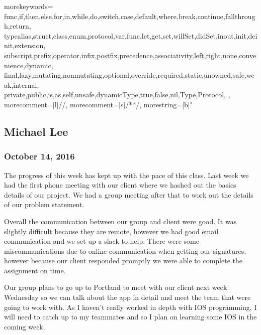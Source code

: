 {
  morekeywords={
    func,if,then,else,for,in,while,do,switch,case,default,where,break,continue,fallthrough,return,
    typealias,struct,class,enum,protocol,var,func,let,get,set,willSet,didSet,inout,init,deinit,extension,
    subscript,prefix,operator,infix,postfix,precedence,associativity,left,right,none,convenience,dynamic,
    final,lazy,mutating,nonmutating,optional,override,required,static,unowned,safe,weak,internal,
    private,public,is,as,self,unsafe,dynamicType,true,false,nil,Type,Protocol,
  },
  morecomment=[l]{//}, %
  morecomment=[s]{/*}{*/}, %
  morestring=[b]" %
}



\subsection{Michael Lee}

\subsubsection{October 14, 2016}\label{section}
The progress of this week has kept up with the pace of this class. Last
week we had the first phone meeting with our client where we hashed out
the basics details of our project. We had a group meeting after that to
work out the details of our problem statement.

Overall the communication between our group and client were good. It was
slightly difficult because they are remote, however we had good email
communication and we set up a slack to help. There were some
miscommunications due to online communication when getting our
signatures, however because our client responded promptly we were able
to complete the assignment on time.

Our group plans to go up to Portland to meet with our client next week
Wednesday so we can talk about the app in detail and meet the team that
were going to work with. As I haven't really worked in depth with IOS
programming, I will need to catch up to my teammates and so I plan on
learning some IOS in the coming week.

